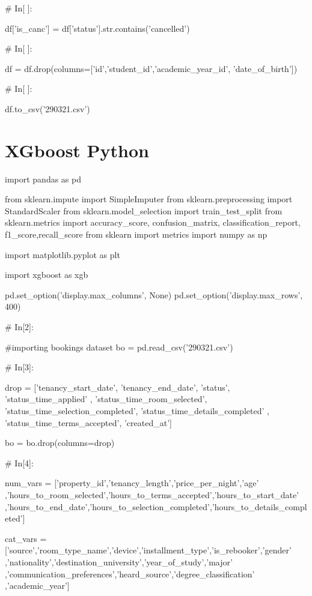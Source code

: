 \begin{python}
# In[ ]:


df['is_canc'] = df['status'].str.contains('cancelled')


# In[ ]:


df = df.drop(columns=['id','student_id','academic_year_id', 'date_of_birth'])


# In[ ]:


df.to_csv('290321.csv')
\end{python}

\section{XGboost Python}

\begin{python}


import pandas as pd

from sklearn.impute import SimpleImputer
from sklearn.preprocessing import StandardScaler
from sklearn.model_selection import train_test_split
from sklearn.metrics import accuracy_score, confusion_matrix, classification_report, f1_score,recall_score
from sklearn import metrics
import numpy as np

import matplotlib.pyplot as plt  

import xgboost as xgb

pd.set_option('display.max_columns', None)
pd.set_option('display.max_rows', 400)


# In[2]:


#importing bookings dataset
bo = pd.read_csv('290321.csv')


# In[3]:


drop = ['tenancy_start_date', 'tenancy_end_date', 'status', 'status_time_applied'
        , 'status_time_room_selected', 'status_time_selection_completed', 'status_time_details_completed'
        , 'status_time_terms_accepted', 'created_at']

bo = bo.drop(columns=drop)


# In[4]:


num_vars = ['property_id','tenancy_length','price_per_night','age'
            ,'hours_to_room_selected','hours_to_terms_accepted','hours_to_start_date'
            ,'hours_to_end_date','hours_to_selection_completed','hours_to_details_completed']

cat_vars = ['source','room_type_name','device','installment_type','is_rebooker','gender'
            ,'nationality','destination_university','year_of_study','major'
            ,'communication_preferences','heard_source','degree_classification'
            ,'academic_year']



\end{python}
